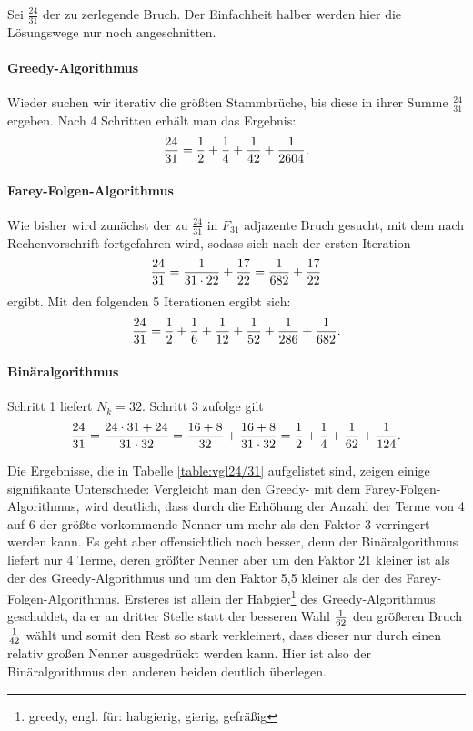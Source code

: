 \vspace{2cm}
\begin{bsp}
	Sei $\frac{24}{31}$ der zu zerlegende Bruch. Der Einfachheit halber werden hier die Lösungswege nur noch angeschnitten.
	
	\paragraph{Greedy-Algorithmus} Wieder suchen wir iterativ die größten Stammbrüche, bis diese in ihrer Summe $\frac{24}{31}$ ergeben. Nach 4 Schritten erhält man das Ergebnis:
	$$\frac{24}{31} = \frac{1}{2} + \frac{1}{4} + \frac{1}{42} + \frac{1}{2604}.$$
	
	\paragraph{Farey-Folgen-Algorithmus}Wie bisher wird zunächst der zu $\frac{24}{31}$ in $F_{31}$ adjazente Bruch gesucht, mit dem nach Rechenvorschrift fortgefahren wird, sodass sich nach der ersten Iteration
	$$\frac{24}{31}=\frac{1}{31 \cdot 22}+ \frac{17}{22} = \frac{1}{682} + \frac{17}{22}$$
	ergibt. Mit den folgenden 5 Iterationen ergibt sich:
	$$\frac{24}{31}=\frac{1}{2}+\frac{1}{6}+\frac{1}{12}+\frac{1}{52}+\frac{1}{286}+\frac{1}{682}.$$
	
	\paragraph{Binäralgorithmus}Schritt 1 liefert $N_k = 32$. Schritt 3 zufolge gilt
	$$\frac{24}{31} = \frac{24 \cdot 31 + 24}{31\cdot32} = \frac{16+8}{32} + \frac{16+8}{31 \cdot 32} = \frac{1}{2} + \frac{1}{4} + \frac{1}{62} + \frac{1}{124}.$$
	
	Die Ergebnisse, die in Tabelle \ref{table:vgl24/31} aufgelistet sind, zeigen einige signifikante Unterschiede: Vergleicht man den Greedy- mit dem Farey-Folgen-Algorithmus,  wird deutlich, dass durch die Erhöhung der Anzahl der Terme von 4 auf 6 der größte vorkommende Nenner um mehr als den Faktor 3 verringert werden kann. Es geht aber offensichtlich noch besser, denn der Binäralgorithmus liefert nur 4 Terme, deren größter Nenner aber um den Faktor 21 kleiner ist als der des Greedy-Algorithmus und um den Faktor 5,5 kleiner als der des Farey-Folgen-Algorithmus. Ersteres ist allein der Habgier\footnote{greedy, engl. für: habgierig, gierig, gefräßig} des Greedy-Algorithmus geschuldet, da er an dritter Stelle statt der besseren Wahl $\frac{1}{62}$ den größeren Bruch $\frac{1}{42}$ wählt und somit den Rest so stark verkleinert, dass dieser nur durch einen relativ großen Nenner ausgedrückt werden kann. Hier ist also der Binäralgorithmus den anderen beiden deutlich überlegen.


\end{bsp}
